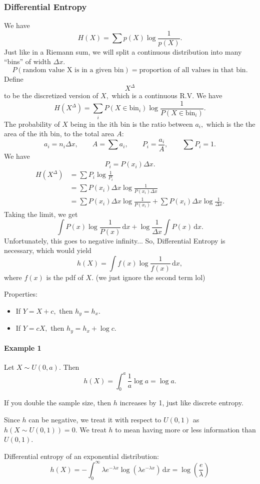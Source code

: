 \documentclass[12pt]{article}
\newcommand{\diffn}[1]{\,\mathrm{d}{#1}}
\begin{document}
\subsubsection{Differential Entropy}
We have
\[H(X)=\sum p(X)\log\frac{1}{p(X)}.\]
Just like in a Riemann sum, we will split a continuous distribution into many ``bins'' of width $\Delta x.$
$$P(\text{random value X is in a given bin})=\text{proportion of all values in that bin}.$$
Define
\[X^{\Delta}\]
to be the discretized version of $X,$ which is a continuous R.V.
We have
\[H\left(X^{\Delta}\right)=\sum_{i}P(X\in\text{bin}_i)\log\frac{1}{P(X\in\text{bin}_i)}.\]
The probability of $X$ being in the ith bin is the ratio between $a_i,$ which is the the area of the ith bin, to the total area $A:$
\[a_i=n_i\Delta x,\qquad A=\sum a_i,\qquad P_i=\frac{a_i}{A},\qquad \sum P_i=1.\]
We have
\[P_i=P(x_i)\Delta x.\]
\begin{align*}
H\left(X^{\Delta}\right)&=\sum P_i\log\frac{1}{P_i}\\&=\sum P(x_i)\Delta x\log\frac{1}{P(x_i)\Delta x}\\&=\sum P(x_i)\Delta x\log\frac{1}{P(x_i)}+\sum P(x_i)\Delta x\log\frac{1}{\Delta x}.
\end{align*}
Taking the limit, we get
\[\int P(x)\log\frac{1}{P(x)}\diffn{x}+\log\frac{1}{\Delta x}\int P(x)\diffn{x}.\]
Unfortunately, this goes to negative infinity...
So, Differential Entropy is necessary, which would yield
\[h(X)=\int f(x)\log\frac{1}{f(x)}\diffn{x},\]
where $f(x)$ is the pdf of $X.$
(we just ignore the second term lol)


Properties:
\begin{itemize}
    \item If $Y=X+c,$ then $h_y=h_x.$
    \item If $Y=cX,$ then $h_y=h_x+\log c.$
\end{itemize}


\paragraph{Example 1}
Let $X\sim U(0,a).$
Then
\[h(X)=\int_0^a\frac{1}{a}\log a=\log a.\]

If you double the sample size, then $h$ increases by 1, just like discrete entropy. 

Since $h$ can be negative, we treat it with respect to $U(0,1)$ as $h(X \sim U(0,1)) = 0.$ We treat $h$ to mean having more or less information than $U(0,1).$

Differential entropy of an exponential distribution:
\[
h(X) = -\int_0^{\infty} {\lambda e^{-\lambda x} \log(\lambda e^{-\lambda x})\diffn{x}}=\log\left(\frac{e}{\lambda}\right)
\]
\end{document}
